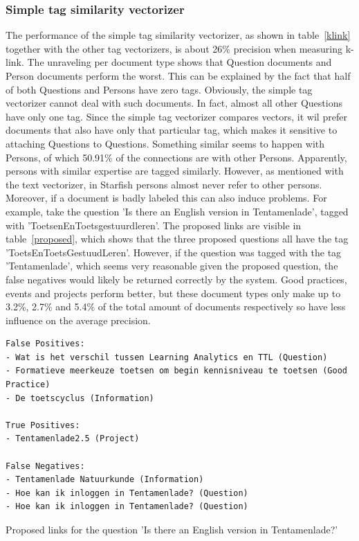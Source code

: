 \subsubsection{Simple tag similarity vectorizer} 
The performance of the simple tag similarity vectorizer, as shown in
table~\ref{klink} together with the other tag vectorizers, is about 26\%
precision when measuring k-link. The unraveling per document type shows that
Question documents and Person documents perform the worst. This can be
explained by the fact that half of both Questions and Persons have zero tags.
Obviously, the simple tag vectorizer cannot deal with such documents. In fact,
almost all other Questions have only one tag. Since the simple tag vectorizer
compares vectors, it wil prefer documents that also have only that particular
tag, which makes it sensitive to attaching Questions to Questions. Something
similar seems to happen with Persons, of which 50.91\% of the connections are
with other Persons.  Apparently, persons with similar expertise are tagged
similarly.  However, as mentioned with the text vectorizer, in Starfish persons
almost never refer to other persons.
Moreover, if a document is badly labeled
this can also induce problems. For example, take the question 'Is there an
English version in Tentamenlade', tagged with 'ToetsenEnToetsgestuurdleren'.
The proposed links are visible in table~\ref{proposed}, which shows that  the
three proposed questions all have the tag 'ToetsEnToetsGestuudLeren'. However,
if the question was tagged with the tag 'Tentamenlade', which seems very
reasonable given the proposed question, the false negatives would likely be
returned correctly by the system. Good practices, events and projects perform
better, but these document types only make up to 3.2\%, 2.7\% and 5.4\% of the
total amount of documents respectively so have less influence on the average
precision.

\begin{table}
\begin{lstlisting}
False Positives:
- Wat is het verschil tussen Learning Analytics en TTL (Question)
- Formatieve meerkeuze toetsen om begin kennisniveau te toetsen (Good Practice)
- De toetscyclus (Information)

True Positives:
- Tentamenlade2.5 (Project)

False Negatives:
- Tentamenlade Natuurkunde (Information)
- Hoe kan ik inloggen in Tentamenlade? (Question)
- Hoe kan ik inloggen in Tentamenlade? (Question)
\end{lstlisting}
\caption{Proposed links for the question 'Is there an English version in Tentamenlade?'}
\label{proposed}
\end{table}

